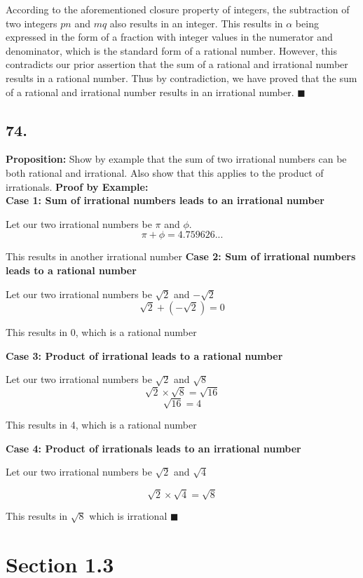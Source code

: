 \documentclass[12pt, a4paper]{article}
\newcommand{\qed}[0]{$\blacksquare$}
\begin{document}
According to the aforementioned closure property of integers, the subtraction of two integers $pn$ and $mq$ also results in an integer. This results in $\alpha$ being expressed in the form of a fraction with integer values in the numerator and denominator, which is the standard form of a rational number. However, this contradicts our prior assertion that the sum of a rational and irrational number results in a rational number. Thus by contradiction, we have proved that the sum of a rational and irrational number results in an irrational number.
\qed

\subsection*{74.}\bigbreak
\textbf{Proposition:}  Show by example that the sum of two irrational numbers can be both rational and irrational. Also show that this applies to the product of irrationals.
\bigbreak
\noindent\textbf{Proof by Example:} \\
\bigbreak
\textbf{Case 1: Sum of irrational numbers leads to an irrational number}

Let our two irrational numbers be $\pi$ and $\phi$.
\[
\pi + \phi = 4.759626...
\]

This results in another irrational number
\bigbreak
\bigbreak
\textbf{Case 2: Sum of irrational numbers leads to a rational number}

Let our two irrational numbers be $\sqrt{2}$ and $-\sqrt{2}$
\[
\sqrt{2} + (- \sqrt{2}) = 0
\]

This results in 0, which is a rational number
\bigbreak
\bigbreak

\textbf{Case 3: Product of irrational leads to a rational number}

Let our two irrational numbers be $\sqrt{2}$ and $\sqrt{8}$
\[
\sqrt{2} \times \sqrt{8} = \sqrt{16}
\]
\[
\sqrt{16} = 4
\]

This results in 4, which is a rational number
\bigbreak
\bigbreak

\textbf{Case 4: Product of irrationals leads to an irrational number}

Let our two irrational numbers be $\sqrt{2}$ and $\sqrt{4}$

\[
\sqrt{2} \times \sqrt{4} = \sqrt{8}
\]

This results in $\sqrt{8}$ which is irrational \qed
\newpage
\thispagestyle{fancy}

\section*{Section 1.3}
\end{document}
